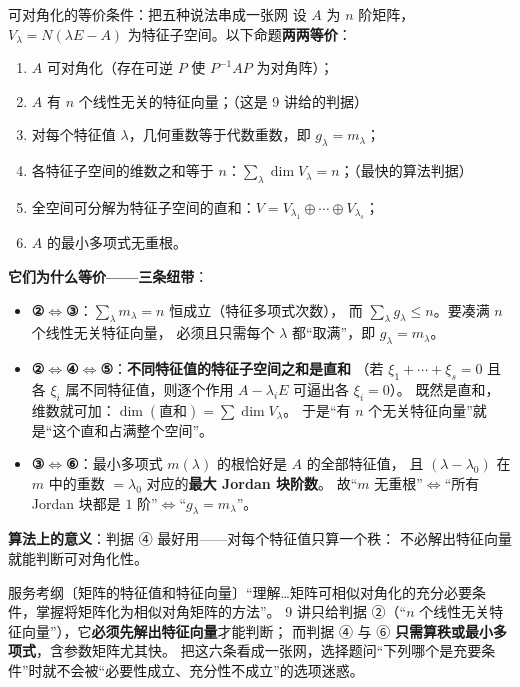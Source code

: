 \begin{fdeep}{可对角化的等价条件：把五种说法串成一张网}
设 $A$ 为 $n$ 阶矩阵，$V_{\lambda}=N(\lambda E-A)$ 为特征子空间。以下命题\textbf{两两等价}：
\begin{enumerate}[leftmargin=2.2em,itemsep=0.22em]
\item $A$ 可对角化（存在可逆 $P$ 使 $P^{-1}AP$ 为对角阵）；
\item $A$ 有 $n$ 个线性无关的特征向量；（这是 9 讲给的判据）
\item 对每个特征值 $\lambda$，几何重数等于代数重数，即 $g_{\lambda}=m_{\lambda}$；
\item 各特征子空间的维数之和等于 $n$：$\sum_{\lambda}\dim V_{\lambda}=n$；（最快的算法判据）
\item 全空间可分解为特征子空间的直和：$V=V_{\lambda_1}\oplus\cdots\oplus V_{\lambda_s}$；
\item $A$ 的最小多项式无重根。
\end{enumerate}

\textbf{它们为什么等价——三条纽带}：
\begin{itemize}[leftmargin=2.2em,itemsep=0.25em]
\item \textbf{②$\iff$③}：$\sum_{\lambda}m_{\lambda}=n$ 恒成立（特征多项式次数），
      而 $\sum_{\lambda}g_{\lambda}\le n$。要凑满 $n$ 个线性无关特征向量，
      必须且只需每个 $\lambda$ 都“取满”，即 $g_{\lambda}=m_{\lambda}$。
\item \textbf{②$\iff$④$\iff$⑤}：\textbf{不同特征值的特征子空间之和是直和}
      （若 $\xi_1+\cdots+\xi_s=0$ 且各 $\xi_i$ 属不同特征值，则逐个作用 $A-\lambda_i E$ 可逼出各 $\xi_i=0$）。
      既然是直和，维数就可加：$\dim(\text{直和})=\sum\dim V_{\lambda}$。
      于是“有 $n$ 个无关特征向量”就是“这个直和占满整个空间”。
\item \textbf{③$\iff$⑥}：最小多项式 $m(\lambda)$ 的根恰好是 $A$ 的全部特征值，
      且 $(\lambda-\lambda_0)$ 在 $m$ 中的重数 $=\lambda_0$ 对应的\textbf{最大 Jordan 块阶数}。
      故“$m$ 无重根”$\iff$“所有 Jordan 块都是 $1$ 阶”$\iff$“$g_{\lambda}=m_{\lambda}$”。
\end{itemize}

\textbf{算法上的意义}：判据 ④ 最好用——对每个特征值只算一个秩：
不必解出特征向量就能判断可对角化性。

\fbref{}服务考纲〔矩阵的特征值和特征向量〕“理解…矩阵可相似对角化的充分必要条件，掌握将矩阵化为相似对角矩阵的方法”。
9 讲只给判据 ②（“$n$ 个线性无关特征向量”），它\textbf{必须先解出特征向量}才能判断；
而判据 ④ 与 ⑥ \textbf{只需算秩或最小多项式}，含参数矩阵尤其快。
把这六条看成一张网，选择题问“下列哪个是充要条件”时就不会被“必要性成立、充分性不成立”的选项迷惑。
\end{fdeep}

